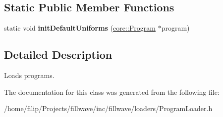\subsection*{Static Public Member Functions}
\begin{DoxyCompactItemize}
\item 
\hypertarget{classfillwave_1_1loader_1_1ProgramLoader_a672d13c10b8c35655a08accec8516376}{}static void {\bfseries init\+Default\+Uniforms} (\hyperlink{classfillwave_1_1core_1_1Program}{core\+::\+Program} $\ast$program)\label{classfillwave_1_1loader_1_1ProgramLoader_a672d13c10b8c35655a08accec8516376}

\end{DoxyCompactItemize}


\subsection{Detailed Description}
Loads programs. 

The documentation for this class was generated from the following file\+:\begin{DoxyCompactItemize}
\item 
/home/filip/\+Projects/fillwave/inc/fillwave/loaders/Program\+Loader.\+h\end{DoxyCompactItemize}
